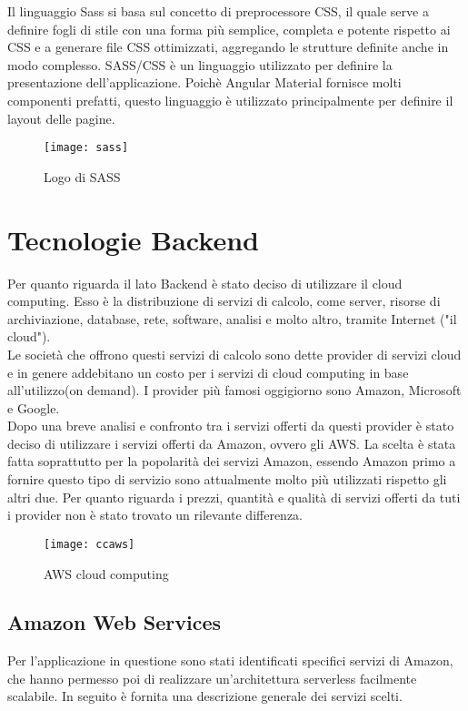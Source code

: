 Il linguaggio Sass si basa sul concetto di preprocessore CSS, il quale serve a definire fogli di stile con una forma più semplice, completa e potente rispetto ai CSS e a generare file CSS ottimizzati, aggregando le strutture definite anche in modo complesso. SASS/CSS è un linguaggio utilizzato per definire la presentazione dell'applicazione. Poichè Angular Material fornisce molti componenti prefatti, questo linguaggio è utilizzato principalmente per definire il layout delle pagine. 
\begin{figure}[!h] 
	\centering 
	\texttt{[image: sass]}
	\caption{Logo di SASS}
\end{figure}

\section{Tecnologie Backend}
Per quanto riguarda il lato Backend è stato deciso di utilizzare il cloud computing. Esso è la distribuzione di servizi di calcolo, come server, risorse di archiviazione, database, rete, software, analisi e molto altro, tramite Internet ("il cloud"). 
\\

Le società che offrono questi servizi di calcolo sono dette provider di servizi cloud e in genere addebitano un costo per i servizi di cloud computing in base all'utilizzo(on demand). I provider più famosi oggigiorno sono Amazon, Microsoft e Google. 
\\

Dopo una breve analisi e confronto tra i servizi offerti da questi provider è stato deciso di utilizzare i servizi offerti da Amazon, ovvero gli AWS. La scelta è stata fatta soprattutto per la popolarità dei servizi Amazon, essendo Amazon primo a fornire questo tipo di servizio sono attualmente molto più utilizzati rispetto gli altri due. Per quanto riguarda i prezzi, quantità e qualità di servizi offerti da tuti i provider non è stato trovato un rilevante differenza. 
\begin{figure}[!h] 
	\centering 
	\texttt{[image: ccaws]}
	\caption{AWS cloud computing}
\end{figure} 
\subsection{Amazon Web Services}
Per l'applicazione in questione sono stati identificati specifici servizi di Amazon, che hanno permesso poi di realizzare un'architettura serverless facilmente scalabile. In seguito è fornita una descrizione generale dei servizi scelti.


